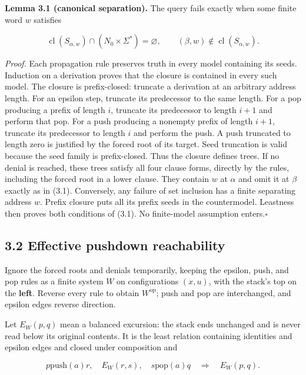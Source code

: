 \documentclass[
  11pt,
  a4paper,
]{article}
\newcounter{none} %
\begin{document}

\textbf{Lemma 3.1 (canonical separation).} The query fails exactly when
some finite word \(w\) satisfies

\[\operatorname{cl}(S_{\alpha,w})\cap(N_0\times\Sigma^*)=\varnothing,
\qquad (\beta,w)\notin\operatorname{cl}(S_{\alpha,w}).\tag{3.1}\]

\emph{Proof.} Each propagation rule preserves truth in every model
containing its seeds. Induction on a derivation proves that the closure
is contained in every such model. The closure is prefix-closed: truncate
a derivation at an arbitrary address length. For an epsilon step,
truncate its predecessor to the same length. For a pop producing a
prefix of length \(i\), truncate its predecessor to length \(i+1\) and
perform that pop. For a push producing a nonempty prefix of length
\(i+1\), truncate its predecessor to length \(i\) and perform the push.
A push truncated to length zero is justified by the forced root of its
target. Seed truncation is valid because the seed family is
prefix-closed. Thus the closure defines trees. If no denial is reached,
these trees satisfy all four clause forms, directly by the rules,
including the forced root in a lower clause. They contain \(w\) at
\(\alpha\) and omit it at \(\beta\) exactly as in (3.1). Conversely, any
failure of set inclusion has a finite separating address \(w\). Prefix
closure puts all its prefix seeds in the countermodel. Leastness then
proves both conditions of (3.1). No finite-model assumption
enters.\nobreak\hspace{.5em}\(\square\)

\subsection{3.2 Effective pushdown
reachability}\label{effective-pushdown-reachability}

Ignore the forced roots and denials temporarily, keeping the epsilon,
push, and pop rules as a finite system \(W\) on configurations
\((x,u)\), with the stack's top on the \textbf{left}. Reverse every rule
to obtain \(W^{\mathrm{op}}\); push and pop are interchanged, and
epsilon edges reverse direction.

Let \(E_W(p,q)\) mean a balanced excursion: the stack ends unchanged and
is never read below its original contents. It is the least relation
containing identities and epsilon edges and closed under composition and

\[p\mathrel{\mathrm{push}(a)}r,\quad E_W(r,s),\quad
s\mathrel{\mathrm{pop}(a)}q\quad\Longrightarrow\quad E_W(p,q).\]
\end{document}
